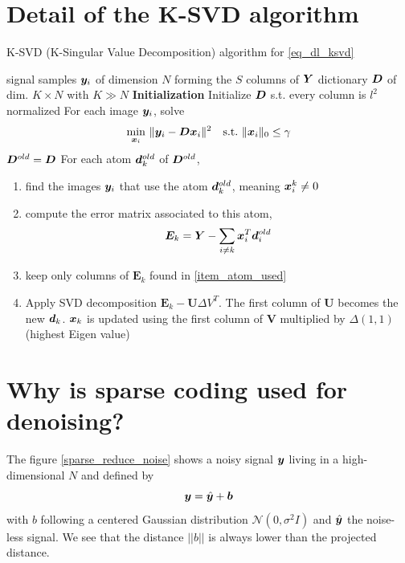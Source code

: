 \section{Detail of the K-SVD algorithm} \label{sec_ksvd_detail}
\begin{algorithm}
    \caption{K-SVD (K-Singular Value Decomposition) algorithm for \eqref{eq_dl_ksvd}} \label{alg_ksvd}
  \begin{algorithmic}[1]
    \Input signal samples $\bm{y}_i$ of dimension $N$ forming the $S$ columns of $\bm{Y}$
    \Output dictionary $\bm{D}$ of dim. $K \times N$ with $K \gg N$
    \State \textbf{Initialization} Initialize $\bm{D}$ s.t. every column is $l^2$ normalized
	\State For each image $\bm{y}_i$, solve  \label{alg_ksvd_sparse_coding}
		\begin{align*}
			\quad \min_{\bm{x}_i}~ & \lVert \bm{y}_i-\bm{D}\bm{x}_i\rVert^2 \quad \text{s.t.}~ \lVert \bm{x}_i \rVert_0 \le \gamma
		\end{align*}
	\State $\bm{D}^{old} = \bm{D}$
	\State For each atom $\bm{d}_k^{old}$ of $\bm{D}^{old}$,  \label{alg_ksvd_dict_update}
	\begin{enumerate}[leftmargin=15mm,label=(\alph*)]
		\item find the images $\bm{y}_i$ that use the atom $\bm{d}_k^{old}$, meaning $\bm{x}_i^k \ne 0$ \label{item_atom_used}
		\item compute the error matrix associated to this atom,
		\begin{align*}
			\bm{E}_k = \bm{Y}-\sum_{i\ne k} \bm{x}_i^T\bm{d}_i^{old}
		\end{align*}
		\item keep only columns of $\bm{E}_k$ found in \ref{item_atom_used}
		\item Apply SVD decomposition $\bm{E}_k - \bm{U} \Delta V^T$. The first column of $\bm{U}$ becomes the new $\bm{d}_k$. $\bm{x}_k$ is updated using the first column of $\bm{V}$ multiplied by $\Delta(1,1)$ (highest Eigen value)
	\end{enumerate}
    \EndWhile
  \end{algorithmic}
\end{algorithm}

\section{Why is sparse coding used for denoising?}

The figure \ref{sparse_reduce_noise} shows a noisy signal $\bm{y}$ living in a high-dimensional $N$ and defined by
$$\bm{y}=\hat{\bm{y}} + \bm{b}$$
with $b$ following a centered Gaussian distribution $\mathcal{N}(0,\sigma^2I)$ and $\hat{\bm{y}}$ the noise-less signal. We see that the distance $||b||$ is always lower than the projected distance.

